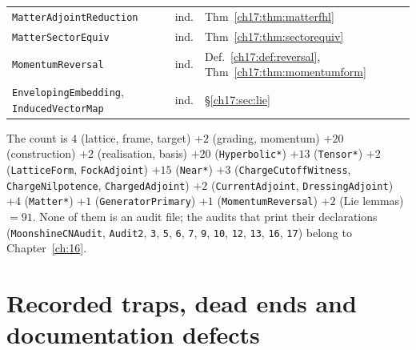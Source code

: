 \begin{center}
\begin{longtable}{p{}p{}p{}}
\texttt{MatterAdjointReduction} & ind. & Thm~\ref{ch17:thm:matterfhl} \\
\texttt{MatterSectorEquiv} & ind. & Thm~\ref{ch17:thm:sectorequiv} \\
\texttt{MomentumReversal} & ind. & Def.~\ref{ch17:def:reversal}, Thm~\ref{ch17:thm:momentumform} \\
\texttt{EnvelopingEmbedding}, \texttt{InducedVectorMap} & ind. & \S\ref{ch17:sec:lie} \\
\bottomrule
\end{longtable}
\end{center}

\noindent The count is $4$ (lattice, frame, target) $+2$ (grading, momentum) $+20$ (construction) $+2$ (realisation, basis)
$+20$ (\texttt{Hyperbolic*}) $+13$ (\texttt{Tensor*}) $+2$ (\texttt{LatticeForm}, \texttt{FockAdjoint}) $+15$ (\texttt{Near*})
$+3$ (\texttt{ChargeCutoffWitness}, \texttt{ChargeNilpotence}, \texttt{ChargedAdjoint}) $+2$ (\texttt{CurrentAdjoint},
\texttt{DressingAdjoint}) $+4$ (\texttt{Matter*}) $+1$ (\texttt{GeneratorPrimary}) $+1$ (\texttt{MomentumReversal}) $+2$ (Lie
lemmas) $=91$.  None of them is an audit file; the audits that print their declarations
(\texttt{MoonshineCNAudit}, \texttt{Audit2}, \texttt{3}, \texttt{5}, \texttt{6}, \texttt{7}, \texttt{9}, \texttt{10},
\texttt{12}, \texttt{13}, \texttt{16}, \texttt{17}) belong to Chapter~\ref{ch:16}.

\section{Recorded traps, dead ends and documentation defects}\label{ch17:sec:traps}

